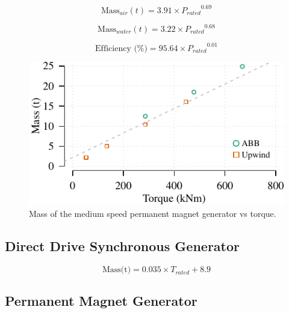 \documentclass{article}\usepackage{graphicx, color}
\makeatletter
\def\maxwidth{ %
  \ifdim\Gin@nat@width>\linewidth
    \linewidth
  \else
    \Gin@nat@width
  \fi
}
\newenvironment{knitrout}{}{} %
\makeatother
\begin{document}
\begin{equation}
  \text{Mass}_{air}(t) = 3.91 \times {P_{rated}}^{0.69}
\end{equation}

\begin{equation}
  \text{Mass}_{water}(t) = 3.22 \times {P_{rated}}^{0.68}
\end{equation}

\begin{equation}
\text{Efficiency (\%)} = 95.64 \times {P_{rated}}^{0.01}
\end{equation}



\begin{knitrout}
\color{fgcolor}\begin{figure}[]

\includegraphics[width=\maxwidth]{figure/plot1gpm} \caption[Mass of the medium speed permanent magnet generator vs torque]{Mass of the medium speed permanent magnet generator vs torque.\label{fig:plot1gpm}}
\end{figure}


\end{knitrout}



\subsection{Direct Drive Synchronous Generator}

\begin{equation}
  \text{Mass(t)} = 0.035 \times {T_{rated}} + 8.9
\end{equation}

\subsection{Permanent Magnet Generator}
\end{document}
